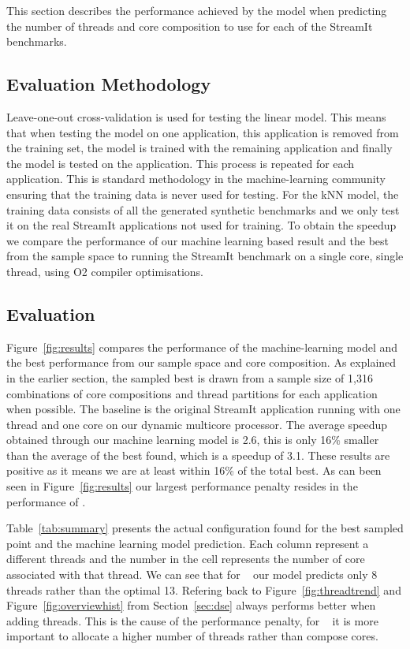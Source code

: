 This section describes the performance achieved by the model when predicting the number of threads and core composition to use for each of the StreamIt benchmarks.
\subsection{Evaluation Methodology}

Leave-one-out cross-validation is used for testing the linear model.
This means that when testing the model on one application, this application is removed from the training set, the model is trained with the remaining application and finally the model is tested on the application.
This process is repeated for each application.
This is standard methodology in the machine-learning community ensuring that the training data is never used for testing.
For the kNN model, the training data consists of all the generated synthetic benchmarks and we only test it on the real StreamIt applications not used for training.
To obtain the speedup we compare the performance of our machine learning based result and the best from the sample space to running the StreamIt benchmark on a single core, single thread, using O2 compiler optimisations. 

\subsection{Evaluation}

Figure~\ref{fig:results} compares the performance of the machine-learning model and the best performance from our sample space and core composition.
As explained in the earlier section, the sampled best is drawn from a sample size of 1,316 combinations of core compositions and thread partitions for each application when possible.
The baseline is the original StreamIt application running with one thread and one core on our dynamic multicore processor.
The average speedup obtained through our machine learning model is 2.6, this is only 16\% smaller than the average of the best found, which is a speedup of 3.1.
These results are positive as it means we are at least within 16\% of the total best.
As can been seen in Figure~\ref{fig:results} our largest performance penalty resides in the performance of .

Table~\ref{tab:summary} presents the actual configuration found for the best sampled point and the machine learning model prediction.
Each column represent a different threads and the number in the cell represents the number of core associated with that thread.
We can see that for ~ our model predicts only 8 threads rather than the optimal 13.
Refering back to Figure~\ref{fig:threadtrend} and Figure~\ref{fig:overviewhist} from Section~\ref{sec:dse}  always performs better when adding threads.
This is the cause of the performance penalty, for ~ it is more important to allocate a higher number of threads rather than compose cores.

